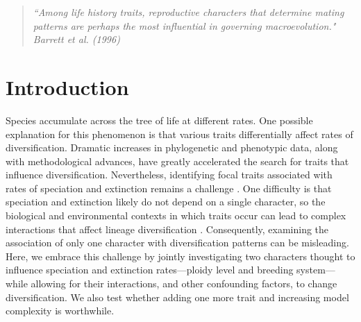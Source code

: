 \begin{quote}
\em{``Among life history traits, reproductive characters that determine mating patterns are perhaps the most influential in governing macroevolution." 
}
\\
\hspace*{\fill}\rm{ Barrett et al. (1996)}
\end{quote}

\section{Introduction}

Species accumulate across the tree of life at different rates. 
One possible explanation for this phenomenon is that various traits differentially affect rates of diversification. 
Dramatic increases in phylogenetic and phenotypic data, along with methodological advances, have greatly accelerated the search for traits that influence diversification.
Nevertheless, identifying focal traits associated with rates of speciation and extinction remains a challenge \citep[\eg][]{maddison_2015, rabosky_2015, beaulieu_2016, rabosky_2017}. 
One difficulty is that speciation and extinction likely do not depend on a single character, so the biological and environmental contexts in which traits occur can lead to complex interactions that affect lineage diversification \citep{beaulieu_2016, caetano_2018, herrera_2018}.
Consequently, examining the association of only one character with diversification patterns can be misleading. 
Here, we embrace this challenge by jointly investigating two characters thought to influence speciation and extinction rates---ploidy level and breeding system---while allowing for their interactions, and other confounding factors, to change diversification. 
We also test whether adding one more trait and increasing model complexity is worthwhile.

